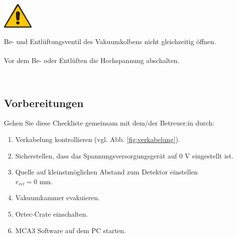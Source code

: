 \begin{minipage}[c]{.15\linewidth}
	\includegraphics[width=1.5cm]{img/attention}
\end{minipage}
\begin{minipage}[t]{.85\linewidth}
	Be- und Entlüftungsventil des Vakuumkolbens nicht gleichzeitig öffnen.
	\\ \\
	Vor dem Be- oder Entlüften die Hochspannung abschalten. 
\end{minipage}\vspace{1em}\\ 
%
\clearpage
%
\subsection{Vorbereitungen}
Gehen Sie diese Checkliste gemeinsam mit dem/der Betreuer:in durch:
\begin{enumerate}
	\item Verkabelung kontrollieren (vgl. Abb. \ref{fig:verkabelung}).
	\item Sicherstellen, dass das Spannungsversorgungsgerät auf $0$ V eingestellt ist.
	\item Quelle auf kleinstmöglichen Abstand zum Detektor einstellen \\$r_{rel} = 0$ mm.
	\item Vakuumkammer evakuieren.
	\item Ortec-Crate einschalten.
	\item MCA3 Software auf dem PC starten.
\end{enumerate}

%
